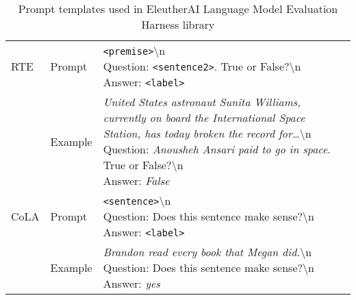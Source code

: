 \begin{table*}
{\begin{tabular}{
    l@{\hskip 0.3in}
    l@{\hskip 0.3in} 
    l
}
\midrule
RTE & 
Prompt &
 \makecell[l]{\texttt{<premise>}\backslash n \\Question:  \texttt{<sentence2>}. True or False?\backslash n \\Answer: \texttt{<label>}} 
\\[5mm]
& Example & 
\makecell[l]{\emph{United States astronaut Sunita Williams, currently on board the International Space Station, has today broken the record for\dots}\backslash n \\Question: \emph{Anousheh Ansari paid to go in space}. True or False?\backslash n \\Answer: \emph{False}}
\\

\midrule
CoLA & 
Prompt &
 \makecell[l]{\texttt{<sentence>}\backslash n \\Question: Does this sentence make sense?\backslash n \\Answer: \texttt{<label>}} 
\\[5mm]
& Example & 
\makecell[l]{\emph{Brandon read every book that Megan did.}\backslash n \\Question: Does this sentence make sense?\backslash n \\Answer: \emph{yes}}\\


\bottomrule
\end{tabular}
}
\caption{Prompt templates used in EleutherAI Language Model Evaluation Harness library \citep{lm-eval-harness}}
\label{tab:prompt_template}
\end{table*}
